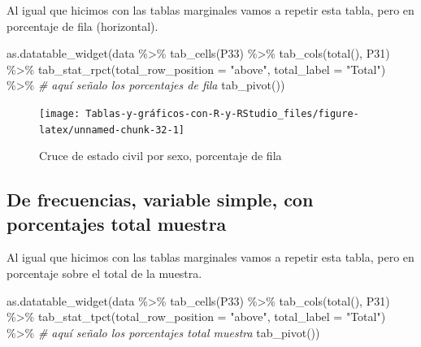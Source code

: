 \documentclass[
]{book}
\newenvironment{Shaded}{\begin{snugshade}}{\end{snugshade}}
\newcommand{\AttributeTok}[1]{\textcolor[rgb]{0.77,0.63,0.00}{#1}}
\newcommand{\CommentTok}[1]{\textcolor[rgb]{0.56,0.35,0.01}{\textit{#1}}}
\newcommand{\FunctionTok}[1]{\textcolor[rgb]{0.00,0.00,0.00}{#1}}
\newcommand{\NormalTok}[1]{#1}
\newcommand{\SpecialCharTok}[1]{\textcolor[rgb]{0.00,0.00,0.00}{#1}}
\newcommand{\StringTok}[1]{\textcolor[rgb]{0.31,0.60,0.02}{#1}}
\begin{document}
Al igual que hicimos con las tablas marginales vamos a repetir esta tabla, pero en porcentaje de fila (horizontal).

\begin{Shaded}
\begin{Highlighting}[]
\FunctionTok{as.datatable\_widget}\NormalTok{(data }\SpecialCharTok{\%\textgreater{}\%}
    \FunctionTok{tab\_cells}\NormalTok{(P33) }\SpecialCharTok{\%\textgreater{}\%}
    \FunctionTok{tab\_cols}\NormalTok{(}\FunctionTok{total}\NormalTok{(), P31) }\SpecialCharTok{\%\textgreater{}\%}
    \FunctionTok{tab\_stat\_rpct}\NormalTok{(}\AttributeTok{total\_row\_position =} \StringTok{"above"}\NormalTok{, }\AttributeTok{total\_label =} \StringTok{"Total"}\NormalTok{) }\SpecialCharTok{\%\textgreater{}\%} \CommentTok{\# aquí señalo los porcentajes de fila}
    \FunctionTok{tab\_pivot}\NormalTok{())}
\end{Highlighting}
\end{Shaded}

\begin{figure}[H]

{\centering \texttt{[image: Tablas-y-gráficos-con-R-y-RStudio\_files/figure-latex/unnamed-chunk-32-1]} 

}

\caption{Cruce de estado civil por sexo, porcentaje de fila}\label{fig:unnamed-chunk-32}
\end{figure}

\hypertarget{de-frecuencias-variable-simple-con-porcentajes-total-muestra}{%
\subsection{De frecuencias, variable simple, con porcentajes total muestra}\label{de-frecuencias-variable-simple-con-porcentajes-total-muestra}}

Al igual que hicimos con las tablas marginales vamos a repetir esta tabla, pero en porcentaje sobre el total de la muestra.

\begin{Shaded}
\begin{Highlighting}[]
\FunctionTok{as.datatable\_widget}\NormalTok{(data }\SpecialCharTok{\%\textgreater{}\%}
    \FunctionTok{tab\_cells}\NormalTok{(P33) }\SpecialCharTok{\%\textgreater{}\%}
    \FunctionTok{tab\_cols}\NormalTok{(}\FunctionTok{total}\NormalTok{(), P31) }\SpecialCharTok{\%\textgreater{}\%}
    \FunctionTok{tab\_stat\_tpct}\NormalTok{(}\AttributeTok{total\_row\_position =} \StringTok{"above"}\NormalTok{, }\AttributeTok{total\_label =} \StringTok{"Total"}\NormalTok{) }\SpecialCharTok{\%\textgreater{}\%} \CommentTok{\# aquí señalo los porcentajes total muestra}
    \FunctionTok{tab\_pivot}\NormalTok{())}
\end{Highlighting}
\end{Shaded}
\end{document}

